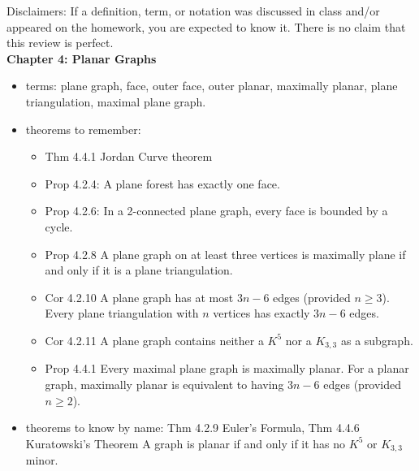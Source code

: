 \documentclass[12pt]{article}
\begin{document}
Disclaimers: If a definition, term, or notation was discussed in class and/or appeared on the homework, you are expected to know it. There is no claim that this review is perfect.\\

\noindent \textbf{Chapter 4: Planar Graphs}
\begin{itemize}
	\item terms: plane graph, face, outer face, outer planar, maximally planar, plane triangulation, maximal plane graph.
	\item theorems to remember: 
	\begin{itemize}
		\item Thm 4.4.1 Jordan Curve theorem
		\item Prop 4.2.4: A plane forest has exactly one face.
		\item Prop 4.2.6: In a 2-connected plane graph, every face is bounded by a cycle.
		\item Prop 4.2.8 A plane graph on at least three vertices is maximally plane if and only if it is a plane triangulation. 
		\item Cor 4.2.10 A plane graph has at most $3n-6$ edges (provided $n \geq 3$). Every plane triangulation with $n$ vertices has exactly $3n-6$ edges.
		\item Cor 4.2.11 A plane graph contains neither a $K^5$ nor a $K_{3,3}$ as a subgraph.
		\item Prop 4.4.1 Every maximal plane graph is maximally planar. For a planar graph, maximally planar is equivalent to having $3n-6$ edges (provided $n \geq 2$).
	\end{itemize}  
	\item theorems to know by name: Thm 4.2.9 Euler's Formula, Thm 4.4.6 Kuratowski's Theorem A graph is planar if and only if it has no $K^5$ or $K_{3,3}$ minor.
\end{itemize}
\end{document}

